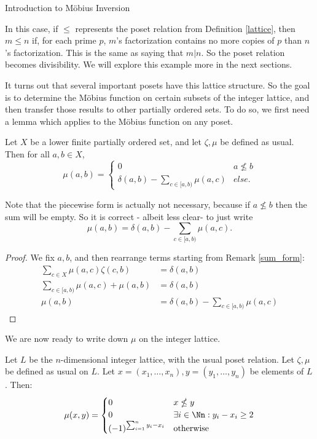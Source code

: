 \documentclass[12pt]{pom_thesis}
\begin{document}
\begin{chapter}{Introduction to M\"obius Inversion}
\begin{examp}
In this case, if $\leq$ represents the poset relation from Definition \ref{lattice}, then $m \leq n$ if, for each prime $p$, $m$'s factorization contains no more copies of $p$ than $n$'s factorization. This is the same as saying that $m|n$. So the poset relation becomes divisibility. We will explore this example more in the next sections.
\end{examp}
It turns out that several important posets have this lattice structure. So the goal is to determine the M\"obius function on certain subsets of the integer lattice, and then transfer those results to other partially ordered sets. To do so, we first need a lemma which applies to the M\"obius function on any poset.
\begin{lemma}\label{recurse}
Let $X$ be a lower finite partially ordered set, and let $\zeta, \mu$ be defined as usual. Then for all $a, b \in X$,
\[
\mu(a,b) = 
\begin{cases}
0 & a \nleq b\\
\delta(a,b)-\sum_{c \in [a,b)}\mu(a,c) & else.
\end{cases}
\]
\end{lemma}
\begin{rmk}
Note that the piecewise form is actually not necessary, because if $a \nleq b$ then the sum will be empty. So it is correct - albeit less clear- to just write
\[
\mu(a,b) = \delta(a,b)-\sum_{c \in [a,b)}\mu(a,c).
\]
\end{rmk}
\begin{proof}
We fix $a,b$, and then rearrange terms starting from Remark \ref{sum_form}:
\begin{align*}
\sum_{c \in X}\mu(a,c) \zeta(c,b) &= \delta(a,b)\\
\sum_{c \in [a,b)} \mu(a,c) + \mu(a,b) &= \delta(a,b)\\
\mu(a,b) &= \delta(a,b) - \sum_{c \in [a,b)} \mu(a,c) 
\end{align*}
\end{proof}
We are now ready to write down $\mu$ on the integer lattice.
\begin{thm}\label{int_lattice}
Let $L$ be the $n$-dimensional integer lattice, with the usual poset relation. Let $\zeta, \mu$ be defined as usual on $L$. Let $x=(x_1,\dots,x_n),y = (y_1,\dots,y_n)$ be elements of $L$. Then:
\[
\mu(x,y) =
\begin{cases}
0 & x\nleq y\\
0 & \exists i \in \Nn: y_i-x_i \geq 2\\
(-1)^{\sum_{i=1}^ny_i-x_i} & \text{otherwise}
\end{cases}
\]
\end{thm}


\end{chapter}
\end{document}
